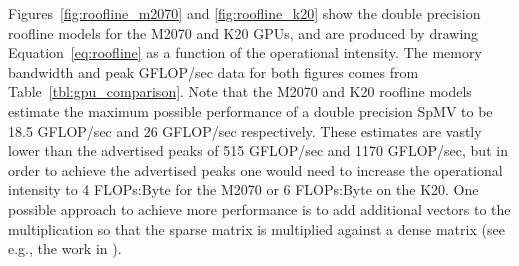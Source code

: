 \documentclass{report}
\begin{document}
Figures~\ref{fig:roofline_m2070} and \ref{fig:roofline_k20} show the double precision roofline models for the M2070 and K20 GPUs, and are produced by drawing Equation~\ref{eq:roofline} as a function of the operational intensity. The memory bandwidth and peak GFLOP/sec data for both figures comes from Table~\ref{tbl:gpu_comparison}. Note that the M2070 and K20 roofline models estimate the maximum possible performance of a double precision SpMV to be 18.5 GFLOP/sec and 26 GFLOP/sec respectively. These estimates are vastly lower than the advertised peaks of 515 GFLOP/sec and 1170 GFLOP/sec, but in order to achieve the advertised peaks one would need to increase the operational intensity to 4 FLOPs:Byte for the M2070 or 6 FLOPs:Byte on the K20. One possible approach to achieve more performance is to add additional vectors to the multiplication so that the sparse matrix is multiplied against a dense matrix (see e.g., the work in \cite{ErlebacherSauleFlyerBollig2013}). 
\end{document}

